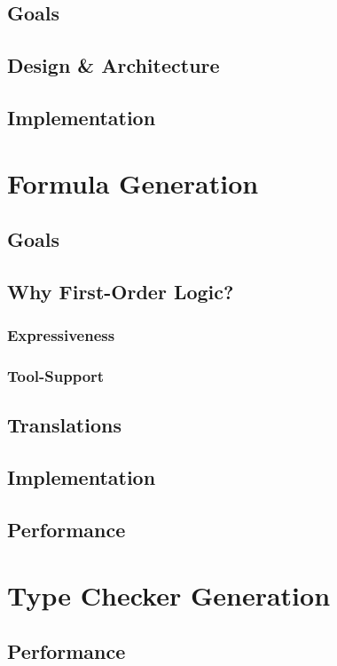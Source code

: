 \documentclass[a4paper,twoside]{report}
\numberwithin{definition}{chapter}
\begin{document}
\section{Goals}
\section{Design \& Architecture}
\section{Implementation}

\chapter{Formula Generation}
\section{Goals}
\section{Why First-Order Logic?}
\subsection{Expressiveness}
\subsection{Tool-Support}
\section{Translations}
\section{Implementation}
\section{Performance}

\chapter{Type Checker Generation}
\section{Performance}
\end{document}

